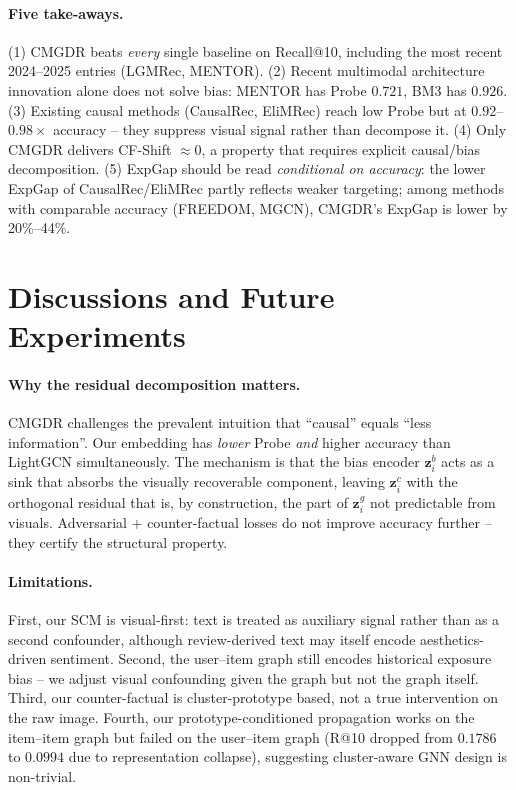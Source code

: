 \documentclass[12pt,a4paper]{article}
\begin{document}
\paragraph{Five take-aways.}
(1) CMGDR beats \emph{every} single baseline on Recall@10, including the most recent
2024--2025 entries (LGMRec, MENTOR). (2) Recent multimodal architecture innovation
alone does not solve bias: MENTOR has Probe $0.721$, BM3 has $0.926$. (3) Existing
causal methods (CausalRec, EliMRec) reach low Probe but at $0.92$--$0.98\times$
accuracy -- they suppress visual signal rather than decompose it. (4) Only CMGDR
delivers CF-Shift $\approx 0$, a property that requires explicit causal/bias
decomposition. (5) ExpGap should be read \emph{conditional on accuracy}: the lower
ExpGap of CausalRec/EliMRec partly reflects weaker targeting; among methods with
comparable accuracy (FREEDOM, MGCN), CMGDR's ExpGap is lower by 20\%--44\%.

\section{Discussions and Future Experiments}\label{sec:disc}

\paragraph{Why the residual decomposition matters.}
CMGDR challenges the prevalent intuition that ``causal'' equals ``less information''.
Our embedding has \emph{lower} Probe \emph{and} higher accuracy than LightGCN
simultaneously. The mechanism is that the bias encoder $\mathbf{z}_i^b$ acts as a
sink that absorbs the visually recoverable component, leaving $\mathbf{z}_i^c$ with
the orthogonal residual that is, by construction, the part of $\mathbf{z}_i^g$ not
predictable from visuals. Adversarial + counter-factual losses do not improve
accuracy further -- they certify the structural property.

\paragraph{Limitations.}
First, our SCM is visual-first: text is treated as auxiliary signal rather than as a
second confounder, although review-derived text may itself encode aesthetics-driven
sentiment. Second, the user--item graph still encodes historical exposure bias --
we adjust visual confounding given the graph but not the graph itself. Third, our
counter-factual is cluster-prototype based, not a true intervention on the raw image.
Fourth, our prototype-conditioned propagation works on the item--item graph but failed
on the user--item graph (R@10 dropped from $0.1786$ to $0.0994$ due to representation
collapse), suggesting cluster-aware GNN design is non-trivial.
\end{document}
